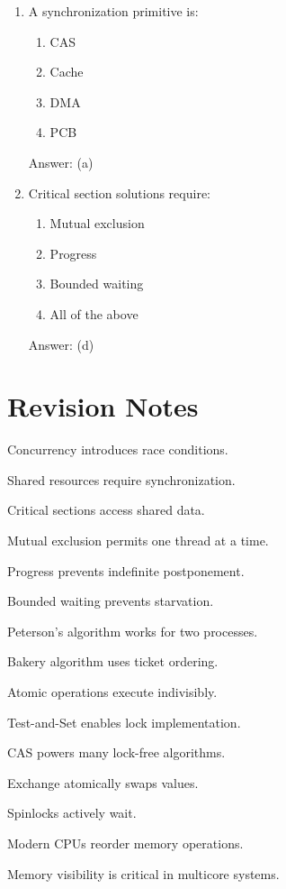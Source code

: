 \begin{enumerate}
\item A synchronization primitive is:
\begin{enumerate}[label=(\alph*)]
\item CAS
\item Cache
\item DMA
\item PCB
\end{enumerate}
Answer: (a)

\item Critical section solutions require:
\begin{enumerate}[label=(\alph*)]
\item Mutual exclusion
\item Progress
\item Bounded waiting
\item All of the above
\end{enumerate}
Answer: (d)
\end{enumerate}

\section{Revision Notes}

\begin{revisionnotes}
\item Concurrency introduces race conditions.
\item Shared resources require synchronization.
\item Critical sections access shared data.
\item Mutual exclusion permits one thread at a time.
\item Progress prevents indefinite postponement.
\item Bounded waiting prevents starvation.
\item Peterson's algorithm works for two processes.
\item Bakery algorithm uses ticket ordering.
\item Atomic operations execute indivisibly.
\item Test-and-Set enables lock implementation.
\item CAS powers many lock-free algorithms.
\item Exchange atomically swaps values.
\item Spinlocks actively wait.
\item Modern CPUs reorder memory operations.
\item Memory visibility is critical in multicore systems.
\end{revisionnotes}

